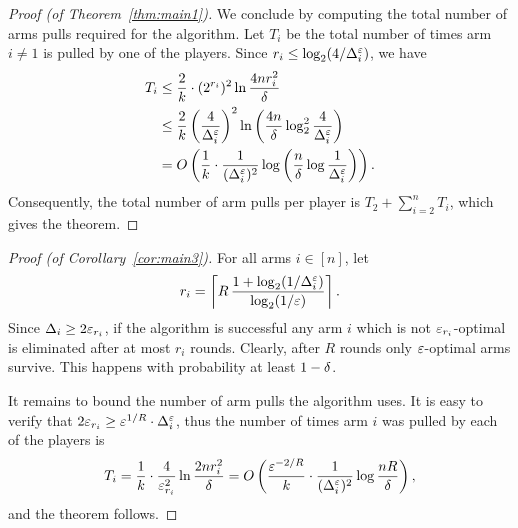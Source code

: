 \documentclass{article} %
\newcommand{\Dele}{\Del^{\eps}}
\begin{document}
\begin{proof}[Proof (of Theorem~\ref{thm:main1})]
We conclude by computing the total number of arms pulls required for the algorithm. 
Let $T_i$ be the total number of times arm~$i \ne 1$ is pulled by one of the players.
Since $r_i \le \log_2(4/\Dele_i)$, we have 
\begin{align*}
	T_i 
	&\le \frac{2}{k} \cdot (2^{r_i})^2 \ln \frac{4n r_i^2}{\del} \\
	&\le \frac{2}{k} \left( \frac{4}{\Dele_i} \right)^2 
		\ln \left( \frac{4n}{\del} \log_2^2 \frac{4}{\Dele_i} \right) \\
	&= \OO{
		\frac{1}{k} \cdot
		\frac{1}{(\Dele_i)^2} \log \left(\frac{n}{\del} \log \frac{1}{\Dele_i}\right)
		} .
\end{align*}
Consequently, the total number of arm pulls per player is $T_2 + \sum_{i=2}^{n} T_i$, which gives the theorem.
\end{proof}





\begin{proof}[Proof (of Corollary~\ref{cor:main3})]
For all arms $i \in [n]$, let
\begin{align*}
	r_i = \left\lceil
		R \, \frac{1+\log_2 (1/\Dele_i)}{\log_2 (1/\eps)}
	\right\rceil .
\end{align*}
Since $\Delta_i \ge 2\varepsilon_{r_i}$, if the algorithm is successful any arm $i$ which is not $\varepsilon_{r_i}$-optimal is eliminated after at most $r_i$ rounds.
Clearly, after $R$ rounds only $\varepsilon$-optimal arms survive.
This happens with probability at least $1-\delta$.

It remains to bound the number of arm pulls the algorithm uses.
It is easy to verify that $2\eps_{r_i} \ge \eps^{1/R} \cdot \Dele_i$, thus the number of times arm $i$ was pulled by each of the players is
\begin{align*}
	T_i 
	= \frac{1}{k} \cdot \frac{4}{\eps_{r_i}^{2}} \ln \frac{2n r_i^2}{\del}
	= \OO{
		\frac{\eps^{-2/R}}{k} \cdot \frac{1}{(\Dele_i)^2} \log \frac{n R}{\del}
	} ,
\end{align*}
and the theorem follows.
\end{proof}



\fi
\end{document}
